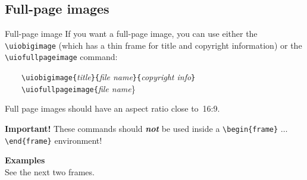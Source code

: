 \documentclass[UKenglish,aspectratio=169]{beamer}
\newcommand{\Dots}{\ensuremath{\ldots}}
\newcommand{\p}[1]{\texttt{#1}}
\newcommand{\pcmd}[1]{\p{\textbackslash #1}}
\newcommand{\penv}[1]{\pcmd{begin}\ppar{#1} \Dots{} \pcmd{end}\ppar{#1}}
\newcommand{\ppar}[1]{\p{\{#1\}}}
\begin{document}


\subsection{Full-page images}

\begin{frame}{Full-page image}
  If you want a full-page image, you can use either the
  \pcmd{uiobigimage} (which has a thin frame for title and copyright
  information)
  or the \pcmd{uiofullpageimage} command:

  \medskip
  ~~~~\pcmd{uiobigimage}\p{\{}\emph{title}\p{\}\{}\emph{file
        name}\p{\}\{}\emph{copyright info}\p{\}}\\
  ~~~~\pcmd{uiofullpageimage}\p{\{}\emph{file name}{\}}

  \medskip
  Full page images should have an aspect ratio close to~16:9.

  \bigskip
  \begin{alert}{\textbf{Important!} }
    These commands should \textbf{\emph{not}} be used inside a
    \penv{frame} environment! 
  \end{alert}

  \medskip
  \textbf{Examples}\\
  See the next two frames.
\end{frame}

\end{document}
